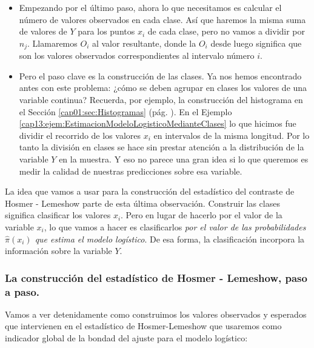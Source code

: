 \begin{itemize}
\item Empezando por el último paso, ahora lo que necesitamos es calcular el número de valores observados en cada clase. Así que haremos la misma suma de valores de $Y$ para los puntos $x_i$  de cada clase, pero no vamos a dividir por $n_j$. Llamaremos $O_i$ al valor resultante, donde la $O_i$ desde luego significa que son los valores observados correspondientes al intervalo número $i$.

\item Pero el paso clave es la construcción de las clases. Ya nos hemos encontrado antes con este problema: ¿cómo se deben agrupar en clases los valores de una variable continua? Recuerda, por ejemplo, la construcción del histograma en el Sección \ref{cap01:sec:Histogramas} (pág. \pageref{cap01:sec:Histogramas}). En el Ejemplo \ref{cap13:ejem:EstimacionModeloLogisticoMedianteClases} lo que hicimos fue dividir el recorrido de los valores $x_i$ en intervalos  de la misma longitud. Por lo tanto la división en clases se hace sin prestar atención a la distribución de la variable $Y$ en la muestra. Y eso no parece una gran idea si lo que queremos es medir la calidad de nuestras predicciones sobre esa variable.

\end{itemize}

La idea que vamos a usar para la construcción del estadístico del contraste de Hosmer - Lemeshow parte de esta última observación. Construir las clases significa clasificar los valores $x_i$. Pero en lugar de hacerlo por el valor de la variable $x_i$, lo que vamos a hacer es clasificarlos {\em por el valor de las probabilidades $\hat{\pi}(x_i)$ que estima el modelo logístico}. De esa forma, la clasificación incorpora la información sobre la variable $Y$.


\subsubsection*{La construcción del estadístico de Hosmer - Lemeshow, paso a paso.}
\label{cap13:subsubsec:ConstruccionEstadisticoHosmerLemeshowPasoPaso}

Vamos a ver detenidamente como construimos los valores observados y esperados que intervienen en el estadístico de Hosmer-Lemeshow que usaremos como indicador global de la bondad del ajuste para el modelo logístico:

